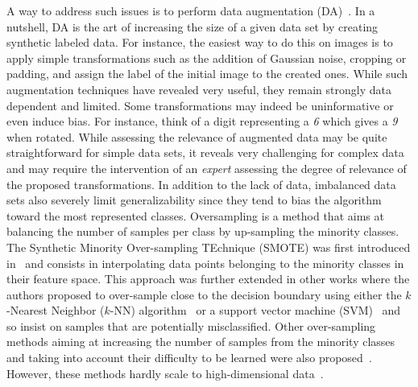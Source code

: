 \documentclass[10pt,journal,compsoc]{IEEEtran}
\begin{document}
A way to address such issues is to perform data augmentation (DA)~\cite{tanner_calculation_1987}. In a nutshell, DA is the art of increasing the size of a given data set by creating synthetic labeled data. For instance, the easiest way to do this on images is to apply simple transformations such as the addition of Gaussian noise, cropping or padding, and assign the label of the initial image to the created ones. While such augmentation techniques have revealed very useful, they remain strongly data dependent and limited. Some transformations may indeed be uninformative or even induce bias. For instance, think of a digit representing a \emph{6} which gives a \emph{9} when rotated. While assessing the relevance of augmented data may be quite straightforward for simple data sets, it reveals very challenging for complex data and may require the intervention of an \emph{expert} assessing the degree of relevance of the proposed transformations. In addition to the lack of data, imbalanced data sets also severely limit generalizability since they tend to bias the algorithm toward the most represented classes. Oversampling is a method that aims at balancing the number of samples per class by up-sampling the minority classes. The Synthetic Minority Over-sampling TEchnique (SMOTE) was first introduced in~\cite{chawla_smote_2002} and consists in interpolating data points belonging to the minority classes in their feature space. This approach was further extended in other works where the authors proposed to over-sample close to the decision boundary using either the $k$-Nearest Neighbor ($k$-NN) algorithm~\cite{hutchison_borderline-smote_2005} or a support vector machine (SVM)~\cite{nguyen_borderline_2011} and so insist on samples that are potentially misclassified. Other over-sampling methods aiming at increasing the number of samples from the minority classes and taking into account their difficulty to be learned were also proposed~\cite{haibo_he_adasyn_2008,barua_mwmote--majority_2012}. However, these methods hardly scale to high-dimensional data~\cite{blagus_smote_2013, fernandez_smote_2018}.
\end{document}
